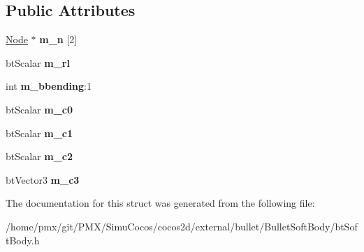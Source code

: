 \subsection*{Public Attributes}
\begin{DoxyCompactItemize}
\item 
\mbox{\label{structbtSoftBody_1_1Link_ad45191444e0c41525c7be8dc72eb8f7f}} 
\hyperlink{structbtSoftBody_1_1Node}{Node} $\ast$ {\bfseries m\+\_\+n} \mbox{[}2\mbox{]}
\item 
\mbox{\label{structbtSoftBody_1_1Link_ae817453c9089ab7e0ddfa32b300b0d8a}} 
bt\+Scalar {\bfseries m\+\_\+rl}
\item 
\mbox{\label{structbtSoftBody_1_1Link_a17ea04d617ec225f0213b30228ad6cb1}} 
int {\bfseries m\+\_\+bbending}\+:1
\item 
\mbox{\label{structbtSoftBody_1_1Link_a42498700f2ae06261fcf41f5f1733369}} 
bt\+Scalar {\bfseries m\+\_\+c0}
\item 
\mbox{\label{structbtSoftBody_1_1Link_abb46e72d3788091ec006b866ee2b4692}} 
bt\+Scalar {\bfseries m\+\_\+c1}
\item 
\mbox{\label{structbtSoftBody_1_1Link_ad89b9138b78a7c5ad5f2ed99bedb96c7}} 
bt\+Scalar {\bfseries m\+\_\+c2}
\item 
\mbox{\label{structbtSoftBody_1_1Link_a3d49299cc32dfbe9e864b6bd183e2d7f}} 
bt\+Vector3 {\bfseries m\+\_\+c3}
\end{DoxyCompactItemize}


The documentation for this struct was generated from the following file\+:\begin{DoxyCompactItemize}
\item 
/home/pmx/git/\+P\+M\+X/\+Simu\+Cocos/cocos2d/external/bullet/\+Bullet\+Soft\+Body/bt\+Soft\+Body.\+h\end{DoxyCompactItemize}
